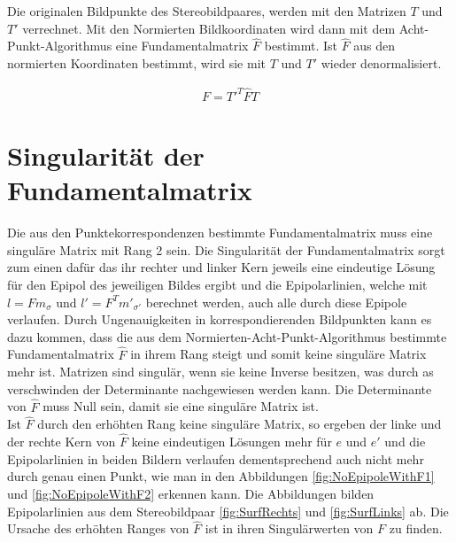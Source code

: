 Die originalen Bildpunkte des Stereobildpaares, werden mit den Matrizen $T$ und $T'$ verrechnet. Mit den Normierten Bildkoordinaten wird dann mit dem Acht-Punkt-Algorithmus eine Fundamentalmatrix $\hat{F}$ bestimmt\cite{HZ,HZ8,Ferid,Brooks}. Ist $\hat{F}$ aus den normierten Koordinaten bestimmt, wird sie mit $T$ und $T'$ wieder denormalisiert.

\begin{gather}
	F = T'^T\hat{F}T
\end{gather}



\section{Singularität der Fundamentalmatrix}
\label{sec:SingularityOfF}

Die aus den Punktekorrespondenzen bestimmte Fundamentalmatrix muss eine singuläre Matrix mit Rang 2 sein\cite{HZ,ZZGXr,Ferid}. Die Singularität der Fundamentalmatrix sorgt zum einen dafür das ihr rechter und linker Kern jeweils eine eindeutige Lösung für den Epipol des jeweiligen Bildes ergibt und die Epipolarlinien, welche mit $l = Fm_\sigma$ und $l' = F^Tm'_{\sigma'}$ berechnet werden, auch alle durch diese Epipole verlaufen\cite{HZ}. Durch Ungenauigkeiten in korrespondierenden Bildpunkten kann es dazu kommen, dass die aus dem Normierten-Acht-Punkt-Algorithmus bestimmte Fundamentalmatrix $\hat{F}$ in ihrem Rang steigt und somit keine singuläre Matrix mehr ist. Matrizen sind singulär, wenn sie keine Inverse besitzen, was durch as verschwinden der Determinante nachgewiesen werden kann\cite{FormelsammlungMatrizen}. Die Determinante von $\hat{F}$ muss Null sein, damit sie eine singuläre Matrix ist.\\

Ist $\hat{F}$ durch den erhöhten Rang keine singuläre Matrix, so ergeben der linke und der rechte Kern von $\hat{F}$ keine eindeutigen Lösungen mehr für $e$ und $e'$ und die Epipolarlinien in beiden Bildern verlaufen dementsprechend auch nicht mehr durch genau einen Punkt, wie man in den Abbildungen \ref{fig:NoEpipoleWithF1} und \ref{fig:NoEpipoleWithF2} erkennen kann. Die Abbildungen bilden Epipolarlinien aus dem Stereobildpaar \ref{fig:SurfRechts} und \ref{fig:SurfLinks} ab. Die Ursache des erhöhten Ranges von $\hat{F}$ ist in ihren Singulärwerten von $F$ zu finden.\\


%
%
%

